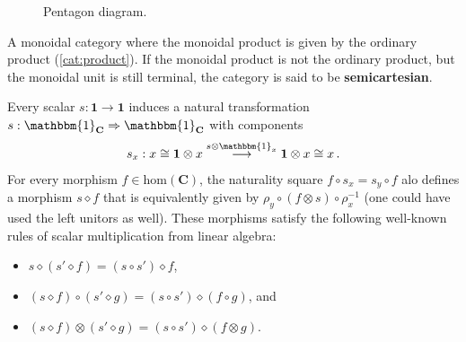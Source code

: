     \begin{figure}[ht!]
        \centering
        \caption{Pentagon diagram.}
        \label{fig:pentagon_diagram}
    \end{figure}

    \begin{example}\label{cat:semicartesian}
        A monoidal category where the monoidal product is given by the ordinary product (\cref{cat:product}). If the monoidal product is not the ordinary product, but the monoidal unit is still terminal, the category is said to be \textbf{semicartesian}.
    \end{example}

    \begin{property}
        Every scalar $s:\mathbf{1}\rightarrow\mathbf{1}$ induces a natural transformation $s:\mathbbm{1}_{\mathbf{C}}\Rightarrow\mathbbm{1}_{\mathbf{C}}$ with components
        \begin{gather}
            s_x:x\cong\mathbf{1}\otimes x\overset{s\otimes\mathbbm{1}_x}{\longrightarrow}\mathbf{1}\otimes x\cong x\,.
        \end{gather}
        For every morphism $f\in\mathrm{hom}(\mathbf{C})$, the naturality square $f\circ s_x=s_y\circ f$ alo defines a morphism $s\diamond f$ that is equivalently given by $\rho_y\circ(f\otimes s)\circ\rho^{-1}_x$ (one could have used the left unitors as well). These morphisms satisfy the following well-known rules of scalar multiplication from linear algebra:
        \begin{itemize}
            \item $s\diamond(s'\diamond f) = (s\circ s')\diamond f$,
            \item $(s\diamond f)\circ(s'\diamond g) = (s\circ s')\diamond(f\circ g)$, and
            \item $(s\diamond f)\otimes(s'\diamond g) = (s\circ s')\diamond(f\otimes g)$.
        \end{itemize}
    \end{property}

